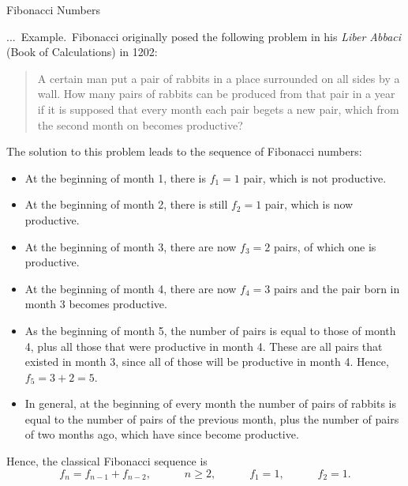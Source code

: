 \documentclass[smaller,hyperref={CJKbookmarks=true}]{beamer}
\newcounter{zhuo}[subsection]
\renewcommand{\thezhuo}{\thesection.\thesubsection.\arabic{zhuo}}
\newenvironment{EXAMPLE}{\stepcounter{zhuo}\alert{\!\thezhuo.~Example.\,}}{}
\begin{document}
\begin{frame}{Fibonacci Numbers}
\begin{spacing}{1.1}
\begin{EXAMPLE}
Fibonacci originally posed the following problem in his \emph{Liber Abbaci} (Book of Calculations) in 1202:
\begin{quote}
A certain man put a pair of rabbits in a place surrounded on all
sides by a wall. How many pairs of rabbits can be produced from
that pair in a year if it is supposed that every month each pair
begets a new pair, which from the second month on becomes
productive?
\end{quote}
The solution to this problem leads to the sequence of Fibonacci numbers:
\begin{itemize}
  \item At the beginning of month 1, there is $f_1=1$ pair, which is not productive.
  \item At the beginning of month 2, there is still $f_2=1$ pair, which is now productive.
  \item At the beginning of month 3, there are now $f_3=2$ pairs, of which one is productive.
\newpage\vspace*{6pt}
  \item At the beginning of month 4, there are now $f_4=3$ pairs and the pair born in month 3 becomes productive.
  \item As the beginning of month 5, the number of pairs is equal to those of month 4, plus all those that were productive in month 4. These are all pairs that existed in month 3, since all of those will be productive in month 4. Hence, $f_5 = 3 + 2 = 5$.
  \item In general, at the beginning of every month the number of pairs of rabbits is equal to the number of pairs of the previous month, plus the number of pairs of two months ago, which have since become productive.
\end{itemize}
Hence, the classical Fibonacci sequence is
\[f_n=f_{n-1}+f_{n-2},\qquad\quad
n\geq2,\qquad\quad f_1=1,\qquad\quad
f_2=1.\]
\end{EXAMPLE}
\end{spacing}
\end{frame}
\end{document}
